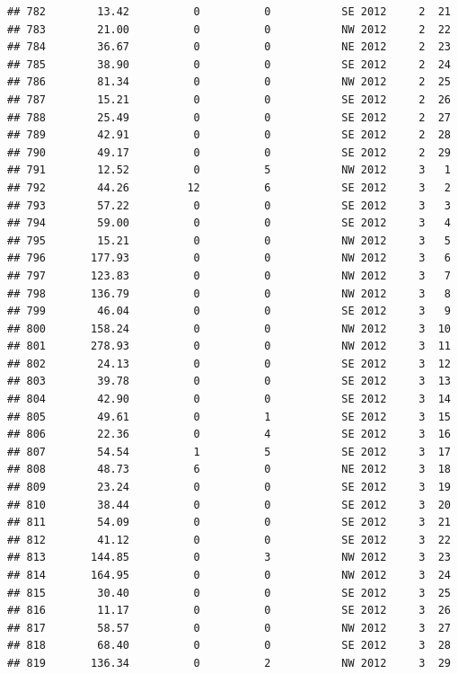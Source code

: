 \documentclass[
]{article}
\begin{document}
\begin{verbatim}
## 782        13.42          0          0           SE 2012     2  21
## 783        21.00          0          0           NW 2012     2  22
## 784        36.67          0          0           NE 2012     2  23
## 785        38.90          0          0           SE 2012     2  24
## 786        81.34          0          0           NW 2012     2  25
## 787        15.21          0          0           SE 2012     2  26
## 788        25.49          0          0           SE 2012     2  27
## 789        42.91          0          0           SE 2012     2  28
## 790        49.17          0          0           SE 2012     2  29
## 791        12.52          0          5           NW 2012     3   1
## 792        44.26         12          6           SE 2012     3   2
## 793        57.22          0          0           SE 2012     3   3
## 794        59.00          0          0           SE 2012     3   4
## 795        15.21          0          0           NW 2012     3   5
## 796       177.93          0          0           NW 2012     3   6
## 797       123.83          0          0           NW 2012     3   7
## 798       136.79          0          0           NW 2012     3   8
## 799        46.04          0          0           SE 2012     3   9
## 800       158.24          0          0           NW 2012     3  10
## 801       278.93          0          0           NW 2012     3  11
## 802        24.13          0          0           SE 2012     3  12
## 803        39.78          0          0           SE 2012     3  13
## 804        42.90          0          0           SE 2012     3  14
## 805        49.61          0          1           SE 2012     3  15
## 806        22.36          0          4           SE 2012     3  16
## 807        54.54          1          5           SE 2012     3  17
## 808        48.73          6          0           NE 2012     3  18
## 809        23.24          0          0           SE 2012     3  19
## 810        38.44          0          0           SE 2012     3  20
## 811        54.09          0          0           SE 2012     3  21
## 812        41.12          0          0           SE 2012     3  22
## 813       144.85          0          3           NW 2012     3  23
## 814       164.95          0          0           NW 2012     3  24
## 815        30.40          0          0           SE 2012     3  25
## 816        11.17          0          0           SE 2012     3  26
## 817        58.57          0          0           NW 2012     3  27
## 818        68.40          0          0           SE 2012     3  28
## 819       136.34          0          2           NW 2012     3  29

\end{verbatim}
\end{document}
